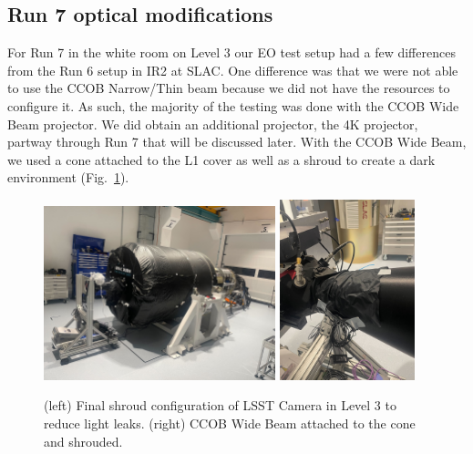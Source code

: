 
\subsection{Run 7 optical modifications}\label{run-7-optical-modifications}

For Run 7 in the white room on Level 3 our EO test setup had a few differences from the Run 6 setup in IR2 at SLAC. One difference was that we were not able to use the CCOB Narrow/Thin beam because we did not have the resources to configure it. As
such, the majority of the testing was done with the CCOB Wide Beam
projector\citep{2024SPIE13103E..0WU}. We did obtain an additional projector, the 4K projector, partway through Run 7 that will be discussed later. With the CCOB Wide Beam,
we used a cone attached to the L1 cover as well as a shroud to create a
dark environment (Fig.~\ref{fig:LSSTCam_config}).

\begin{figure}[htbp]
\centering
    \includegraphics[width=0.6\textwidth]{figures/Camera_Shroud.jpg} 
    \includegraphics[width=0.35\textwidth]{figures/CCOB_Wide_Shroud.jpg} \\
\caption{(left) Final shroud configuration of LSST Camera in Level 3 to reduce light leaks. (right) CCOB Wide Beam attached to the cone and shrouded.}
\label{fig:LSSTCam_config}
\end{figure}

